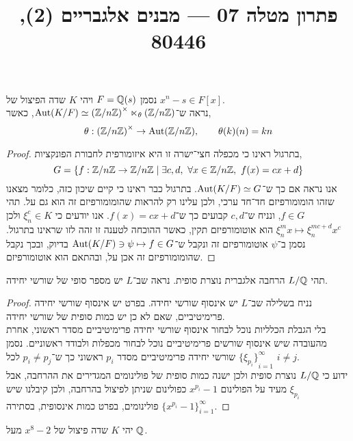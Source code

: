 
\title{פתרון מטלה 07 --- מבנים אלגבריים (2), 80446}


\maketitle
\maketitleprint[red]

\question{}
נסמן $F = \mathbb{Q}(s)$ ויהי $K$ שדה הפיצול של $x^n - s \in F[x]$. \\
נראה ש־$\operatorname{Aut}(K / F) \simeq {(\mathbb{Z}/ n \mathbb{Z})}^\times \ltimes_{\theta} (\mathbb{Z} / n \mathbb{Z})$, כאשר,
\[
	\theta : {(\mathbb{Z} / n \mathbb{Z})}^\times \to \operatorname{Aut}(\mathbb{Z} / n \mathbb{Z}),
	\qquad
	\theta(k)(n) = k n
\]
\begin{proof}
	בתרגול ראינו כי מכפלה חצי־ישרה זו היא איזומורפית לחבורת הפונקציות,
	\[
		G = \{ f : \mathbb{Z} / n \mathbb{Z} \to \mathbb{Z} / n \mathbb{Z} \mid \exists c, d,\ \forall x \in \mathbb{Z} / n \mathbb{Z},\ f(x) = cx + d \}
	\]
	אנו נראה אם כך ש־$\operatorname{Aut}(K / F) \simeq G$.
	בתרגול כבר ראינו כי קיים שיכון כזה, כלומר מצאנו שזהו הומומורפיזם חד־חד ערכי, ולכן עלינו רק להראות שהומומורפיזם זה הוא גם על.
	תהי $f \in G$, ונניח ש־$c, d$ קבועים כך ש־$f(x) = cx + d$.
	אנו יודעים כי $\xi_n^c \in K$ ולכן $\xi_n^m x \mapsto \xi_n^{mc + d} x^c$ הוא אוטומורפיזם תקין, כאשר ההוכחה לטענה זו זהה לזו שראינו בתרגול.
	נסמן ב־$\psi$ אוטומורפיזם זה ונקבל ש־$\operatorname{Aut}(K / F) \ni \psi \mapsto f \in G$ בדיוק, ובכך נקבל שהומומורפיזם זה אכן על, ובהתאם הוא אוטומורפיזם.
\end{proof}

\question{}
תהי $L / \mathbb{Q}$ הרחבה אלגברית נוצרת סופית.
נראה שב־$L$ יש מספר סופי של שורשי יחידה.
\begin{proof}
	נניח בשלילה שב־$L$ יש אינסוף שורשי יחידה.
	בפרט יש אינסוף שורשי יחידה פרימיטיביים, שאם לא כן יש כמות סופית של שורשי יחידה. \\
	בלי הגבלת הכלליות נוכל לבחור אינסוף שורשי יחידה פרימיטיביים מסדר ראשוני, אחרת מהעובדה שיש אינסוף שורשים פרימיטיביים נוכל לבחור מכפלות ולבודד ראשוניים.
	נסמן ${\{ \xi_{p_i} \}}_{i = 1}^\infty$ שורשי יחידה פרימיטיביים מסדר $p_i$ ראשוני כך ש־$p_i \ne p_j$ לכל $i \ne j$. \\
	ידוע כי $L / \mathbb{Q}$ נוצרת סופית ולכן ישנה כמות סופית של פולינומים המגדירים את ההרחבה, אבל $\xi_{p_i}$ מעיד על הפולינום $x^{p_i} - 1$ כפולינום שניתן לפיצול בהרחבה,
	ולכן קיבלנו שיש ${\{ x^{p_i} - 1 \}}_{i = 1}^\infty$ פולינומים, בפרט כמות אינסופית, בסתירה.
\end{proof}

\question{}
יהי $K$ שדה פיצול של $x^8 - 2$ מעל $\mathbb{Q}$.

